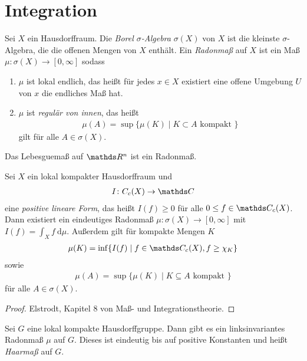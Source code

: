 \chapter{Integration}
\begin{defi}
Sei $X$ ein Hausdorffraum. Die \emph{Borel $\sigma$-Algebra} $\sigma(X)$ von $X$ ist die kleinste $\sigma$-Algebra, die die offenen Mengen von $X$ enthält.
Ein \emph{Radonmaß} auf $X$ ist ein Maß $\mu \colon \sigma(X) \to [0,\infty]$ sodass
\begin{enumerate}[label=\roman*)]
\item $\mu$ ist lokal endlich, das heißt für jedes $x\in X$ existiert eine offene Umgebung $U$ von $x$ die endliches Maß hat.
\item $\mu$ ist \emph{regulär von innen}, das heißt
\begin{align*}
\mu(A)=\sup\{\mu(K)\mid K\subset A \text{ kompakt }\}
\end{align*}
gilt für alle $A \in \sigma(X)$.
\end{enumerate}
\end{defi}

\begin{bsp}
Das Lebesguemaß auf $\Rn$ ist ein Radonmaß.
\end{bsp}

\begin{thm}[Riesz]
Sei $X$ ein lokal kompakter Hausdorffraum und
\begin{align*}
I \colon C_c(X) \to \C
\end{align*}
eine \emph{positive lineare Form}, das heißt $I(f)\geq 0$ für alle $0\leq f \in \C_c(X)$.
Dann existiert ein eindeutiges Radonmaß $\mu \colon \sigma(X)\to [0,\infty]$ mit $I(f)=\int_X f ~\mathrm{d}\mu$.
Außerdem gilt für kompakte Mengen $K$
\begin{align*}
\mu(K)=\inf\{I(f)\mid f\in \C_c(X),f \geq \chi_K\}
\end{align*}
sowie
\begin{align*}
\mu(A)=\sup\{\mu(K)\mid K\subseteq A \text{ kompakt } \}
\end{align*}
für alle $A \in \sigma(X)$.
\end{thm}
\begin{proof}
Elstrodt, Kapitel 8 von Maß- und Integrationstheorie.
\end{proof}

\begin{thm}[Haar]
Sei $G$ eine lokal kompakte Hausdorffgruppe.
Dann gibt es ein linksinvariantes Radonmaß $\mu$ auf $G$.
Dieses ist eindeutig bis auf positive Konstanten und heißt \emph{Haarmaß} auf $G$.
\end{thm}

